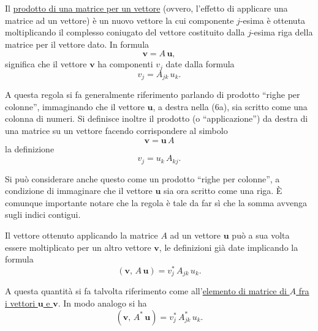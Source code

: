 \documentclass[11pt, a4paper]{book}
\numberwithin{equation}{section}
\begin{document}
Il \underline{prodotto di una matrice per un vettore} (ovvero, l'effetto di applicare una matrice ad un vettore) è un nuovo vettore la cui componente $j$-esima è ottenuta moltiplicando il complesso coniugato del vettore costituito dalla $j$-esima riga della matrice per il vettore dato. In formula
\begin{equation}
    \mathbf{v} = A\,\mathbf{u},
    \tag{6a}
\end{equation}
significa che il vettore $\mathbf{v}$ ha componenti $v_j$ date dalla formula
\begin{equation}
    v_j = A_{jk}\, u_k.
    \tag{6b}
\end{equation}

A questa regola si fa generalmente riferimento parlando di prodotto ``righe per colonne'', immaginando che il vettore $\mathbf{u}$, a destra nella (6a), sia scritto come una colonna di numeri. Si definisce inoltre il prodotto (o ``applicazione'') da destra di una matrice su un vettore facendo corrispondere al simbolo
\begin{equation}
    \mathbf{v} = \mathbf{u}\,A
    \tag{6c}
\end{equation}
la definizione
\begin{equation}
    v_j = u_k\, A_{kj}.
    \tag{6d}
\end{equation}

Si può considerare anche questo come un prodotto ``righe per colonne'', a condizione di immaginare che il vettore $\mathbf{u}$ sia ora scritto come una riga. È comunque importante notare che la regola è tale da far sì che la somma avvenga sugli indici contigui.

Il vettore ottenuto applicando la matrice $A$ ad un vettore $\mathbf{u}$ può a sua volta essere moltiplicato per un altro vettore $\mathbf{v}$, le definizioni già date implicando la formula
\begin{equation}
    \left( \mathbf{v},\, A\,\mathbf{u} \right) = v_j^*\, A_{jk}\, u_k.
    \tag{7a}
\end{equation}

A questa quantità si fa talvolta riferimento come all'\underline{elemento di matrice di $A$ fra i vettori $\mathbf{u}$ e $\mathbf{v}$}. In modo analogo si ha
\begin{equation}
    \left( \mathbf{v},\, A^*\,\mathbf{u} \right) = v_j^*\, A_{jk}^*\, u_k.
    \tag{7b}
\end{equation}
\end{document}
